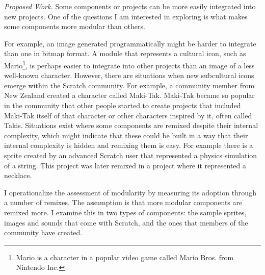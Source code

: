 \emph{Proposed Work.}
Some components or projects can be more easily integrated into new projects. 
One of the questions I am interested in exploring is what makes some components more modular than others.

For example, an image generated programmatically might be harder to integrate than one in bitmap format. 
A module that represents a cultural icon, such as Mario\footnote{Mario is a character in a popular video game called Mario Bros. from Nintendo Inc.}, is perhaps easier to integrate into other projects than an image of a less well-known character.
However, there are situations when new subcultural icons emerge within the Scratch community.
For example, a community member from New Zealand created a character called Maki-Tak. 
Maki-Tak became so popular in the community that other people started to create projects that included Maki-Tak itself of  that character or other characters inspired by it, often called Takis.
Situations exist where some components are remixed despite their internal complexity, which might indicate that these could be built in a way that their internal complexity is hidden and remixing them is easy. 
For example there is a sprite created by an advanced Scratch user that represented a physics simulation of a string. 
This project was later remixed in a project where it represented a necklace.

I  operationalize the assessment of modularity by measuring its adoption through a number of remixes.
The assumption is that more modular components are remixed more.
I examine this in two types of components: the sample sprites, images and sounds that come with Scratch, and the ones that members of the community have created.

